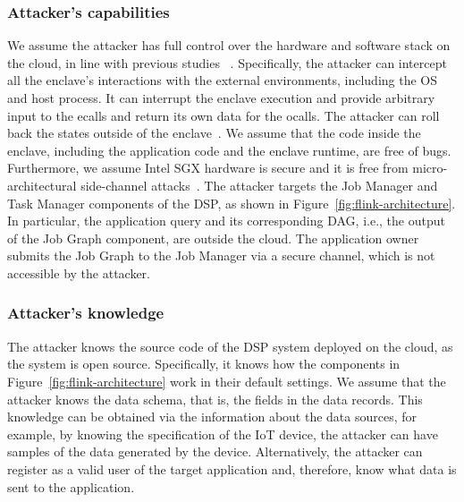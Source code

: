 \subsubsection*{Attacker's capabilities} 
%
{We assume the attacker has full control over the
hardware and software stack on the cloud, in line with previous studies~\cite{Silva19, sasy2018zerotrace, xiao2021privacy, Sasy19, Kim17, Ahmad18}
}. 
% 
%
Specifically, the attacker can intercept all the enclave's interactions with the external environments, including the OS and host process. It can interrupt the enclave execution and provide arbitrary input to the ecalls and return its own data for the ocalls. 
%
The attacker can roll back the
states outside of the enclave~\cite{matetic2017rote,strackx2016ariadne}. We assume that the code inside the enclave, 
including the application code and the enclave runtime, are free of bugs. Furthermore, we assume Intel SGX hardware is secure and
it is free from micro-architectural side-channel attacks~\cite{van2018foreshadow, murdock2020plundervolt,van2020lvi}. 
The attacker targets the Job Manager and Task Manager components of the DSP, as shown in Figure~\ref{fig:flink-architecture}. In particular, the application query and its corresponding DAG, i.e., the output of the Job Graph component, are outside the cloud. The application owner submits the Job Graph to the Job Manager via a secure channel, which is not accessible by the attacker. 


\subsubsection*{Attacker's knowledge} The attacker knows the source code of the DSP system deployed on the cloud, as the system is open source. Specifically, it knows how the components in Figure~\ref{fig:flink-architecture} work in their default settings. We assume that the attacker knows the data schema, that is, the fields in the data records. This knowledge can be obtained via the information about the data sources, for example, by knowing the specification of the IoT device, the attacker can have samples of the data generated by the device. Alternatively, the attacker can register as a valid user of the target application and, therefore, know what data is sent to the application. 

